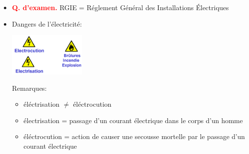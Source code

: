 \documentclass[a4paper]{article}
\begin{document}
\begin{itemize}





\item \textcolor{red}{\textbf{Q. d'examen.}} RGIE = Réglement Général des Installations Électriques





\item Dangers de l'électricité:
\begin{center}
\includegraphics[width=0.3\textwidth]{images/elec01.PNG}
\end{center}
Remarques:
\begin{itemize}
    \item éléctrisation $ \neq $ éléctrocution
    \item électrisation = passage d'un courant électrique dans le corps d'un homme
    \item éléctrocution = action de causer une secousse mortelle par le passage d'un courant électrique
\end{itemize}






\end{itemize}
\end{document}
